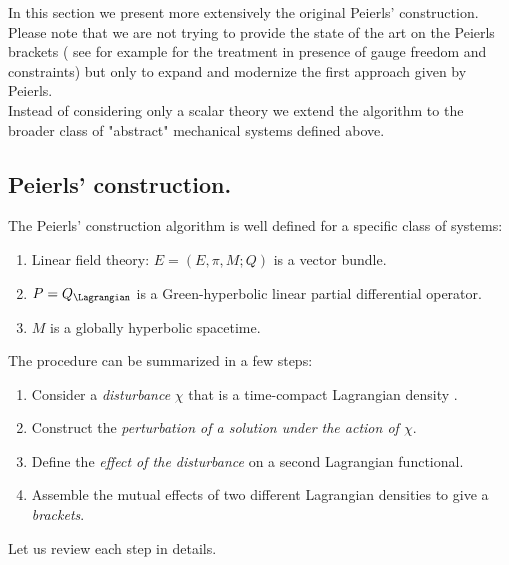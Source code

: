 \documentclass[Main]{subfiles}
\begin{document}
		\vspace{2mm}	
		In this section we present more extensively the original Peierls' construction. 
		Please note that we are not trying to provide the state of the art on the Peierls brackets ( see for example \cite{Khavkine2014} for the treatment in presence of gauge freedom and constraints) but only to expand and modernize the first approach given by Peierls.\\
	Instead of considering only a scalar theory we extend the algorithm to the broader class of "abstract" mechanical systems defined above.
	
	\subsection{Peierls' construction.}\label{Section:PeierlsConstruction}
	The Peierls' construction algorithm is well defined for a specific class of systems:
		\begin{enumerate}[label=(\Alph*)]
			\item\label{HpPeierls1} Linear field theory: $E=(E,\pi,M;Q)$ is a vector bundle.
			\item\label{HpPeierls2} $P=Q_\Lagrangian$ is a Green-hyperbolic linear partial differential operator.
			\item\label{HpPeierls3} $M$ is a globally hyperbolic spacetime.
		\end{enumerate}	
	The procedure can be summarized in a few steps:
	\begin{enumerate}
		\item Consider a \emph{disturbance} $\chi$ that is a time-compact Lagrangian density .
		\item Construct the \emph{perturbation of a solution under the action of $\chi$}.
		\item Define the \emph{effect of the disturbance} on a second Lagrangian functional.
		\item Assemble the mutual effects of two different Lagrangian densities to give a \emph{brackets}.
	\end{enumerate}	
	Let us review each step in details.
	
\end{document}
